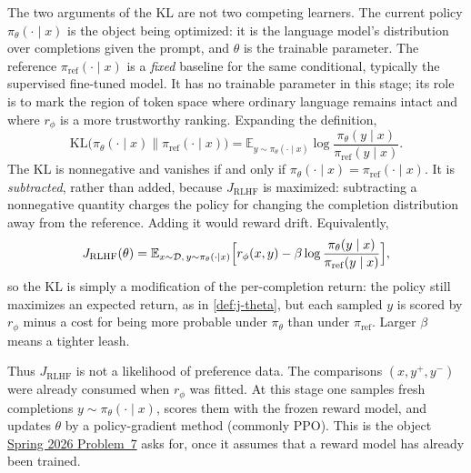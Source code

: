 \documentclass[11pt,a4paper]{article}
\newcommand{\jump}[2]{\hyperref[#1]{#2}}
\theoremstyle{definition}
\begin{document}
\begin{remark}
The two arguments of the KL are not two competing learners. The current policy
$\pi_\theta(\cdot\mid x)$ is the object being optimized: it is the language model's
distribution over completions given the prompt, and $\theta$ is the trainable parameter.
The reference $\pi_{\mathrm{ref}}(\cdot\mid x)$ is a \emph{fixed} baseline for the same
conditional, typically the supervised fine-tuned model. It has no trainable parameter in
this stage; its role is to mark the region of token space where ordinary language remains
intact and where $r_\phi$ is a more trustworthy ranking. Expanding the definition,
\[
\mathrm{KL}\bigl(
\pi_\theta(\cdot\mid x)\mathbin{\|}\pi_{\mathrm{ref}}(\cdot\mid x)
\bigr)
=\mathbb{E}_{y\sim\pi_\theta(\cdot\mid x)}
\log\frac{\pi_\theta(y\mid x)}{\pi_{\mathrm{ref}}(y\mid x)}.
\]
The KL is nonnegative and vanishes if and only if
$\pi_\theta(\cdot\mid x)=\pi_{\mathrm{ref}}(\cdot\mid x)$. It is \emph{subtracted},
rather than added, because $J_{\mathrm{RLHF}}$ is maximized: subtracting a nonnegative
quantity charges the policy for changing the completion distribution away from the
reference. Adding it would reward drift. Equivalently,
\[
J_{\mathrm{RLHF}}(\theta)
=\mathbb{E}_{x\sim\mathcal{D},\,y\sim\pi_\theta(\cdot\mid x)}
\Bigl[
r_\phi(x,y)
-\beta\log\frac{\pi_\theta(y\mid x)}{\pi_{\mathrm{ref}}(y\mid x)}
\Bigr],
\]
so the KL is simply a modification of the per-completion return: the policy still
maximizes an expected return, as in \cref{def:j-theta}, but each sampled $y$ is scored by
$r_\phi$ minus a cost for being more probable under $\pi_\theta$ than under
$\pi_{\mathrm{ref}}$. Larger $\beta$ means a tighter leash.

Thus $J_{\mathrm{RLHF}}$ is not a likelihood of preference data. The comparisons
$(x,y^+,y^-)$ were already consumed when $r_\phi$ was fitted. At this stage one samples
fresh completions $y\sim\pi_\theta(\cdot\mid x)$, scores them with the frozen reward
model, and updates $\theta$ by a policy-gradient method (commonly PPO). This is the
object \jump{prob:spr2026-rlhf}{Spring 2026 Problem~7} asks for, once it assumes that a
reward model has already been trained.
\end{remark}
\end{document}
